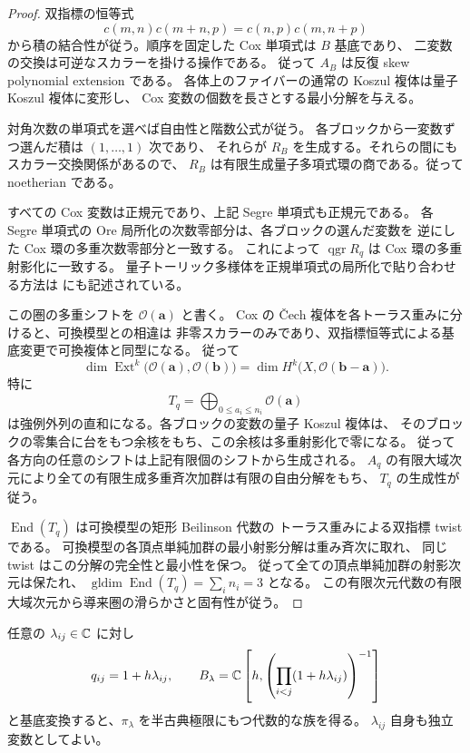 \begin{proof}
双指標の恒等式
\[
 c(m,n)c(m+n,p)=c(n,p)c(m,n+p)
\]
から積の結合性が従う。順序を固定した Cox 単項式は $B$ 基底であり、
二変数の交換は可逆なスカラーを掛ける操作である。
従って $A_B$ は反復 skew polynomial extension である。
各体上のファイバーの通常の Koszul 複体は量子 Koszul 複体に変形し、
Cox 変数の個数を長さとする最小分解を与える。

対角次数の単項式を選べば自由性と階数公式が従う。
各ブロックから一変数ずつ選んだ積は $(1,\ldots,1)$ 次であり、
それらが $R_B$ を生成する。それらの間にもスカラー交換関係があるので、
$R_B$ は有限生成量子多項式環の商である。従って noetherian である。

すべての Cox 変数は正規元であり、上記 Segre 単項式も正規元である。
各 Segre 単項式の Ore 局所化の次数零部分は、各ブロックの選んだ変数を
逆にした Cox 環の多重次数零部分と一致する。
これによって $\operatorname{qgr}R_q$ は Cox 環の多重射影化に一致する。
量子トーリック多様体を正規単項式の局所化で貼り合わせる方法は
\cite[\S\S3--5]{CLS} にも記述されている。

この圏の多重シフトを $\mathcal O(\mathbf a)$ と書く。
Cox の \v Cech 複体を各トーラス重みに分けると、可換模型との相違は
非零スカラーのみであり、双指標恒等式による基底変更で可換複体と同型になる。
従って
\[
 \dim\operatorname{Ext}^k\bigl(\mathcal O(\mathbf a),
       \mathcal O(\mathbf b)\bigr)
 =\dim H^k\bigl(X,\mathcal O(\mathbf b-\mathbf a)\bigr).
\]
特に
\[
 T_q=\bigoplus_{0\leq a_i\leq n_i}\mathcal O(\mathbf a)
\]
は強例外列の直和になる。各ブロックの変数の量子 Koszul 複体は、
そのブロックの零集合に台をもつ余核をもち、この余核は多重射影化で零になる。
従って各方向の任意のシフトは上記有限個のシフトから生成される。
$A_q$ の有限大域次元により全ての有限生成多重斉次加群は有限の自由分解をもち、
$T_q$ の生成性が従う。

$\operatorname{End}(T_q)$ は可換模型の矩形 Beilinson 代数の
トーラス重みによる双指標 twist である。
可換模型の各頂点単純加群の最小射影分解は重み斉次に取れ、
同じ twist はこの分解の完全性と最小性を保つ。
従って全ての頂点単純加群の射影次元は保たれ、
$\operatorname{gldim}\operatorname{End}(T_q)=\sum_i n_i=3$ となる。
この有限次元代数の有限大域次元から導来圏の滑らかさと固有性が従う。
\end{proof}

\begin{corollary}\label{cor:toric-semiclassical}
任意の $\lambda_{ij}\in\mathbb C$ に対し
\[
 q_{ij}=1+h\lambda_{ij},\qquad
 B_\lambda=\mathbb C\left[h,
 \left(\prod_{i<j}(1+h\lambda_{ij})\right)^{-1}\right]
\]
と基底変換すると、$\pi_\lambda$ を半古典極限にもつ代数的な族を得る。
$\lambda_{ij}$ 自身も独立変数としてよい。
\end{corollary}

